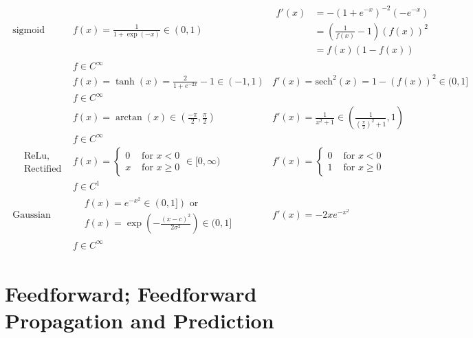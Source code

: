 \documentclass[10pt]{amsart}
\begin{document}
\begin{multicols*}{2}
\[
\begin{gathered}
\begin{aligned}
\text{sigmoid } & f(x) = \frac{1}{ 1+ \exp{(-x)} } \in (0,1) & \begin{aligned} f'(x) & = -(1+e^{-x})^{-2} (-e^{-x}) \\ & = \left( \frac{1}{f(x)} -1\right)(f(x))^2 \\ & = f(x)(1-f(x)) \end{aligned} \\
	& f\in C^{\infty}  &  \\
& f(x) = \tanh{(x)} = \frac{2}{1+ e^{-2x}} -1 \in (-1,1) & f'(x) = \text{sech}^2(x) = 1-(f(x))^2 \in (0,1] \\ 
& f\in C^{\infty} & \\
& f(x) = \arctan{(x)} \in \left( \frac{-\pi}{2}, \frac{\pi}{2} \right) & f'(x) = \frac{1}{x^2 + 1} \in \left(\frac{1}{ \left( \frac{\pi}{2} \right)^2 + 1}, 1 \right) \\ 
& f\in C^{\infty} & \\
\begin{aligned} & \text{ReLu}, \\ & \text{Rectified linear unit} \end{aligned} & f(x) = \begin{cases} 0 & \text{ for } x < 0 \\ x & \text{ for } x \geq 0 \end{cases} \in [0,\infty) & f'(x) = \begin{cases} 0 & \text{ for } x <0 \\ 1 & \text{ for } x \geq 0 \end{cases} \\ 
& f \in C^1 &  \\ 
\text{Gaussian} & \begin{aligned} & f(x) = e^{-x^2} \in (0,1] ) \text{ or } \\
& f(x) = \exp{ \left( - \frac{ (x-c)^2}{ 2\sigma^2} \right) } \in (0,1] \end{aligned} &  f'(x) = -2xe^{-x^2} \\
& f\in C^{\infty} &
\end{aligned}
\end{gathered}
\]



\section{Feedforward; Feedforward Propagation and Prediction}


\end{multicols*}
\end{document}
